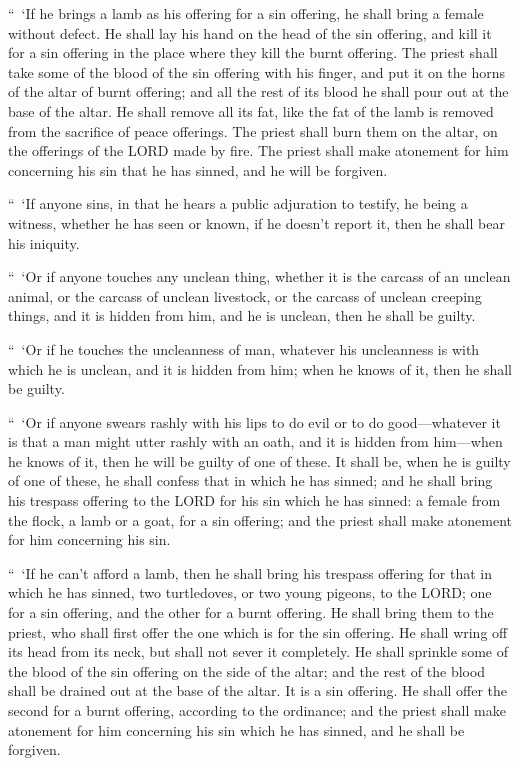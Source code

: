 \myverse{}“ ‘If he brings a lamb as his offering for a sin offering, he
shall bring a female without defect.
\myverse{}He shall lay his hand on the head of the sin offering, and kill it for a sin
offering in the place where they kill the burnt offering.
\myverse{}The priest shall take some of the blood of the sin offering with his finger,
and put it on the horns of the altar of burnt offering; and all the rest of its blood he shall pour out
at the base of the altar.
\myverse{}He shall remove all its fat, like the fat of the lamb is removed from the
sacrifice of peace offerings. The priest shall burn them on the altar, on the offerings of the LORD made
by fire. The priest shall make atonement for him concerning his sin that he has sinned, and he will be
forgiven.


\mychapter{} \myverse*{}“ ‘If anyone sins, in that he hears a public adjuration to testify,
he being a witness, whether he has seen or known, if he doesn’t report it, then he shall bear his iniquity.


\myverse{}“ ‘Or if anyone touches any unclean thing, whether it is the carcass
of an unclean animal, or the carcass of unclean livestock, or the carcass of unclean creeping things,
and it is hidden from him, and he is unclean, then he shall be guilty.


\myverse{}“ ‘Or if he touches the uncleanness of man, whatever his uncleanness
is with which he is unclean, and it is hidden from him; when he knows of it, then he shall be guilty.


\myverse{}“ ‘Or if anyone swears rashly with his lips to do evil or to do
good—whatever it is that a man might utter rashly with an oath, and it is hidden from him—when he knows
of it, then he will be guilty of one of these.
\myverse{}It shall be, when he is guilty of one of these, he shall confess that in which
he has sinned;
\myverse{}and he shall bring his trespass offering to the LORD for his sin which he has
sinned: a female from the flock, a lamb or a goat, for a sin offering; and the priest shall make atonement
for him concerning his sin.


\myverse{}“ ‘If he can’t afford a lamb, then he shall bring his trespass offering
for that in which he has sinned, two turtledoves, or two young pigeons, to the LORD; one for a sin offering,
and the other for a burnt offering.
\myverse{}He shall bring them to the priest, who shall first offer the one which is for
the sin offering. He shall wring off its head from its neck, but shall not sever it completely.
\myverse{}He shall sprinkle some of the blood of the sin offering on the side of the altar;
and the rest of the blood shall be drained out at the base of the altar. It is a sin offering.
\myverse{}He shall offer the second for a burnt offering, according to the ordinance;
and the priest shall make atonement for him concerning his sin which he has sinned, and he shall be forgiven.


